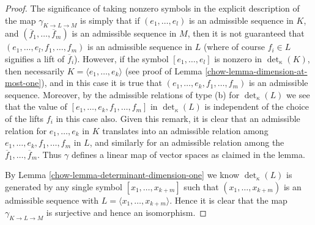 \begin{proof}

The significance of taking nonzero symbols in the explicit description
of the map $\gamma_{K \to L \to M}$ is simply that if $(e_1, \ldots, e_l)$
is an admissible sequence in $K$, and
$(\overline{f}_1, \ldots, \overline{f}_m)$ is an admissible sequence in
$M$, then it is not guaranteed that $(e_1, \ldots, e_l, f_1, \ldots, f_m)$
is an admissible sequence in $L$ (where of course $f_i \in L$ signifies
a lift of $\overline{f}_i$). However, if the symbol
$[e_1, \ldots, e_l]$ is nonzero in $\det_\kappa(K)$, then
necessarily $K = \langle e_1, \ldots, e_k\rangle$ (see
proof of Lemma \ref{chow-lemma-dimension-at-most-one}), and
in this case it is true that $(e_1, \ldots, e_k, f_1, \ldots, f_m)$
is an admissible sequence.
Moreover, by the admissible relations of type (b) for $\det_\kappa(L)$
we see that the value of $[e_1, \ldots, e_k, f_1, \ldots, f_m]$ in
$\det_\kappa(L)$ is independent of the choice of the lifts
$f_i$ in this case also. Given this remark, it is clear
that an admissible relation for $e_1, \ldots, e_k$ in $K$
translates into an admissible relation among
$e_1, \ldots, e_k, f_1, \ldots, f_m$ in $L$, and
similarly for an admissible relation among the
$\overline{f}_1, \ldots, \overline{f}_m$.
Thus $\gamma$ defines a linear map of vector spaces as claimed in the lemma.

\medskip\noindent
By Lemma \ref{chow-lemma-determinant-dimension-one} we know
$\det_\kappa(L)$ is generated by any single
symbol $[x_1, \ldots, x_{k + m}]$ such that
$(x_1, \ldots, x_{k + m})$ is an admissible sequence
with $L = \langle x_1, \ldots, x_{k + m}\rangle$. Hence it is
clear that the map $\gamma_{K \to L \to M}$ is surjective and
hence an isomorphism.


\end{proof}
